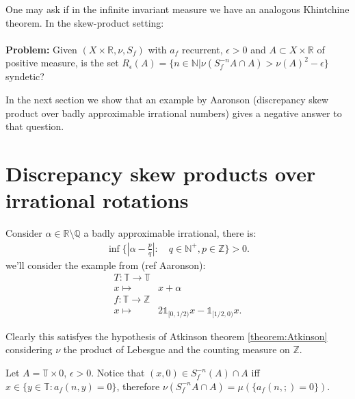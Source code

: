 \documentclass{article}
\begin{document}
One may ask if in the infinite invariant measure we have an
analogous Khintchine theorem. In the skew-product
setting:
\paragraph{}
\textbf{Problem:} Given $(X\times \mathbb{R}, \nu,S_f)$ with $a_f$
recurrent, $\epsilon>0$ and $A\subset X\times \mathbb{R}$ of positive
measure, is the set $R_\epsilon(A)=\{n\in \mathbb{N}|\nu(S_f^{-n}
A\cap A)>\nu(A)^2-\epsilon\}$ syndetic?

In the next section we show that an example by Aaronson (discrepancy 
skew product over badly approximable irrational numbers) gives a negative
answer to that question. 


\section{Discrepancy skew products over irrational rotations}


Consider $\alpha\in \mathbb{R}\setminus \mathbb{Q}$
a badly approximable irrational, there is:
\begin{align*}
    \inf\{|\alpha-\frac{p}{q}| :\quad q\in\mathbb{N}^+, p\in \mathbb{Z}\}>0.
\end{align*}
we'll consider the example from  (ref Aaronson):
\begin{align*}
T:\mathbb{T}\to \mathbb{T}&\\
 x\mapsto & x+\alpha \\
f:\mathbb{T}\to \mathbb{Z}&\\
x\mapsto & 2\mathds{1}_{[0,1/2)}x-\mathds{1}_{[1/2,0)}x.
\end{align*}

Clearly this satisfyes the hypothesis of Atkinson theorem \ref{theorem:Atkinson}
considering $\nu$ the product of Lebesgue and the counting measure on $\mathbb{Z}$.

Let $A=\mathbb{T}\times {0}$, $\epsilon>0$. Notice that $(x,0)
\in S_f^{-n}(A)\cap A$ iff $x\in \{y\in \mathbb{T}: a_f(n,y)=0\}$, 
therefore $\nu(S_f^{-n}A\cap A)=\mu(\{a_f(n,;)=0\})$.
\end{document}
